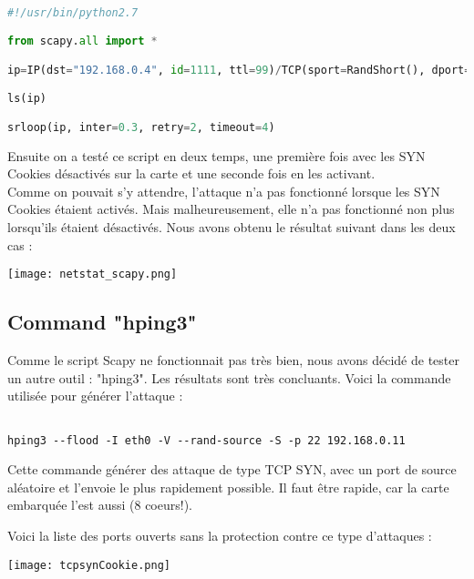 \begin{lstlisting}[frame=single,language=Python]  % Start your code-block

#!/usr/bin/python2.7

from scapy.all import *

ip=IP(dst="192.168.0.4", id=1111, ttl=99)/TCP(sport=RandShort(), dport=[22, 80], seq=12345, ack=1000, window=1000, flags="S")/""

ls(ip)

srloop(ip, inter=0.3, retry=2, timeout=4)
\end{lstlisting}

Ensuite on a testé ce script en deux temps, une première fois avec les SYN Cookies désactivés sur la carte et une seconde fois en les activant.\\

Comme on pouvait s'y attendre, l'attaque n'a pas fonctionné lorsque les SYN Cookies étaient activés. Mais malheureusement, elle n'a pas fonctionné non plus lorsqu'ils étaient désactivés. Nous avons obtenu le résultat suivant dans les deux cas :

\begin{center} 
\hspace{15cm}
\texttt{[image: netstat\_scapy.png]}
\end{center}
\vspace{0.5cm}


\subsection{Command "hping3"}
Comme le script Scapy ne fonctionnait pas très bien, nous avons décidé de tester un autre outil : "hping3". Les résultats sont très concluants. Voici la commande utilisée pour générer l'attaque :
\begin{lstlisting}[frame=single,style=Console]  % Start your code-block

hping3 --flood -I eth0 -V --rand-source -S -p 22 192.168.0.11
\end{lstlisting}

Cette commande générer des attaque de type TCP SYN, avec un port de source aléatoire et l'envoie le plus rapidement possible. Il faut être rapide, car la carte embarquée l'est aussi (8 coeurs!).

Voici la liste des ports ouverts sans la protection contre ce type d'attaques :
\begin{center} 
\hspace{15cm}
\texttt{[image: tcpsynCookie.png]}
\end{center}
\vspace{0.5cm}

